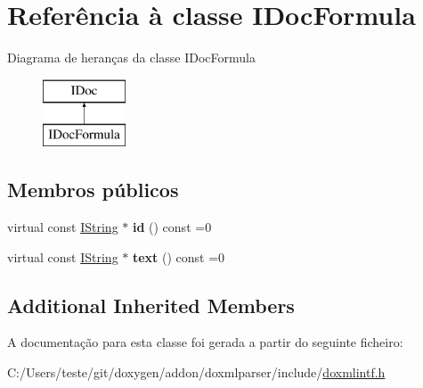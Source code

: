 \hypertarget{class_i_doc_formula}{\section{Referência à classe I\-Doc\-Formula}
\label{class_i_doc_formula}
}
Diagrama de heranças da classe I\-Doc\-Formula\begin{figure}[H]
\begin{center}
\leavevmode
\includegraphics[height=2.000000cm]{class_i_doc_formula}
\end{center}
\end{figure}
\subsection*{Membros públicos}
\begin{DoxyCompactItemize}
\item 
\hypertarget{class_i_doc_formula_aaba28daa272dce8bc14dde330d5b0126}{virtual const \hyperlink{class_i_string}{I\-String} $\ast$ {\bfseries id} () const =0}\label{class_i_doc_formula_aaba28daa272dce8bc14dde330d5b0126}

\item 
\hypertarget{class_i_doc_formula_aa487ae4b2bd6e3e7975ff2efe2666148}{virtual const \hyperlink{class_i_string}{I\-String} $\ast$ {\bfseries text} () const =0}\label{class_i_doc_formula_aa487ae4b2bd6e3e7975ff2efe2666148}

\end{DoxyCompactItemize}
\subsection*{Additional Inherited Members}


A documentação para esta classe foi gerada a partir do seguinte ficheiro\-:\begin{DoxyCompactItemize}
\item 
C\-:/\-Users/teste/git/doxygen/addon/doxmlparser/include/\hyperlink{include_2doxmlintf_8h}{doxmlintf.\-h}\end{DoxyCompactItemize}
